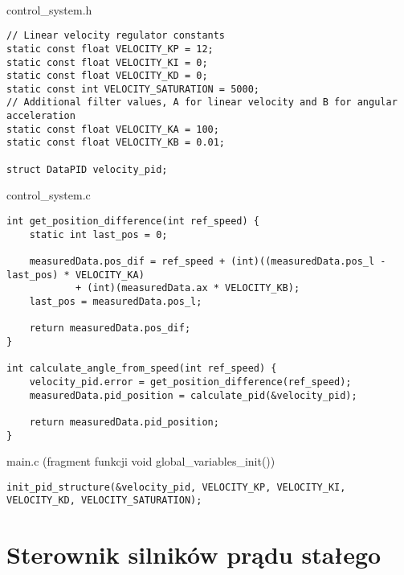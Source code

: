 \documentclass[a4paper,12pt,twoside,openany]{report}
\begin{document}
\\
\noindent control\_system.h
\begin{lstlisting}[style=customc]
// Linear velocity regulator constants
static const float VELOCITY_KP = 12;
static const float VELOCITY_KI = 0;
static const float VELOCITY_KD = 0;
static const int VELOCITY_SATURATION = 5000;
// Additional filter values, A for linear velocity and B for angular acceleration
static const float VELOCITY_KA = 100;
static const float VELOCITY_KB = 0.01;

struct DataPID velocity_pid;
\end{lstlisting}
control\_system.c
\begin{lstlisting}[style=customc]
int get_position_difference(int ref_speed) {
	static int last_pos = 0;
	
	measuredData.pos_dif = ref_speed + (int)((measuredData.pos_l - last_pos) * VELOCITY_KA) 
    		+ (int)(measuredData.ax * VELOCITY_KB);
	last_pos = measuredData.pos_l;
	
	return measuredData.pos_dif;
}

int calculate_angle_from_speed(int ref_speed) {
	velocity_pid.error = get_position_difference(ref_speed);
	measuredData.pid_position = calculate_pid(&velocity_pid);

	return measuredData.pid_position;
}
\end{lstlisting}
main.c (fragment funkcji void global\_variables\_init())
\begin{lstlisting}[style=customc]
init_pid_structure(&velocity_pid, VELOCITY_KP, VELOCITY_KI, VELOCITY_KD, VELOCITY_SATURATION);
\end{lstlisting}

\section{Sterownik silników prądu stałego}
\end{document}
